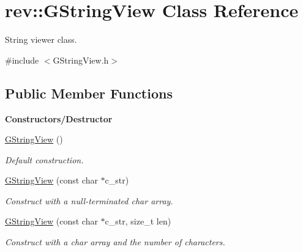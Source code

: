 \hypertarget{classrev_1_1_g_string_view}{}\section{rev\+::G\+String\+View Class Reference}
\label{classrev_1_1_g_string_view}


String viewer class.  




{\ttfamily \#include $<$G\+String\+View.\+h$>$}

\subsection*{Public Member Functions}
\begin{Indent}\textbf{ Constructors/\+Destructor}\par
\begin{DoxyCompactItemize}
\item 
\mbox{\label{classrev_1_1_g_string_view_af5244bd23cd8f603e2014078642407df}} 
\mbox{\hyperlink{classrev_1_1_g_string_view_af5244bd23cd8f603e2014078642407df}{G\+String\+View}} ()
\begin{DoxyCompactList}\small\item\em Default construction. \end{DoxyCompactList}\item 
\mbox{\label{classrev_1_1_g_string_view_a0d2895a250341722a9cf858f92ba9d6b}} 
\mbox{\hyperlink{classrev_1_1_g_string_view_a0d2895a250341722a9cf858f92ba9d6b}{G\+String\+View}} (const char $\ast$c\+\_\+str)
\begin{DoxyCompactList}\small\item\em Construct with a null-\/terminated char array. \end{DoxyCompactList}\item 
\mbox{\label{classrev_1_1_g_string_view_ae81fd2f03f99106662892da30130c8d7}} 
\mbox{\hyperlink{classrev_1_1_g_string_view_ae81fd2f03f99106662892da30130c8d7}{G\+String\+View}} (const char $\ast$c\+\_\+str, size\+\_\+t len)
\begin{DoxyCompactList}\small\item\em Construct with a char array and the number of characters. \end{DoxyCompactList}\item 

\end{DoxyCompactItemize}
\end{Indent}
